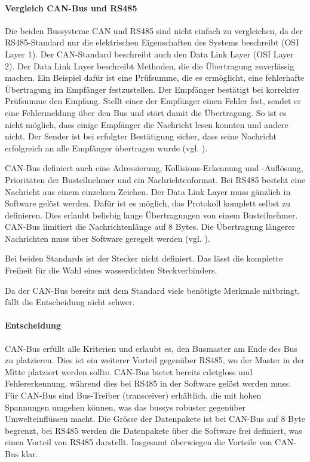 \paragraph{Vergleich CAN-Bus und RS485} Die beiden Bussysteme CAN und RS485 sind nicht einfach zu vergleichen, da der RS485-Standard nur die elektrischen Eigenschaften des Systems beschreibt (OSI Layer 1). Der CAN-Standard beschreibt auch den Data Link Layer (OSI Layer 2). Der Data Link Layer beschreibt Methoden, die die Übertragung zuverlässig machen. Ein Beispiel dafür ist eine Prüfsumme, die es ermöglicht, eine fehlerhafte Übertragung im Empfänger festzustellen. Der Empfänger bestätigt bei korrekter Prüfsumme den Empfang. Stellt einer der Empfänger einen Fehler fest, sendet er eine Fehlermeldung über den Bus und stört damit die Übertragung. So ist es nicht möglich, dass einige Empfänger die Nachricht lesen konnten und andere nicht. Der Sender ist bei erfolgter Bestätigung sicher, dass seine Nachricht erfolgreich an alle Empfänger übertragen wurde (vgl. \cite{ixxatcan}). 

CAN-Bus definiert auch eine Adressierung, Kollisions-Erkennung und -Auflösung, Prioritäten der Busteilnehmer und ein Nachrichtenformat. Bei RS485 besteht eine Nachricht aus einem einzelnen Zeichen. Der Data Link Layer muss gänzlich in Software gelöst werden. Dafür ist es möglich, das Protokoll komplett selbst zu definieren. Dies erlaubt beliebig lange Übertragungen von einem Busteilnehmer. CAN-Bus limitiert die Nachrichtenlänge auf 8 Bytes. Die Übertragung längerer Nachrichten muss über Software geregelt werden (vgl. \cite{ixxatcan}).

Bei beiden Standards ist der Stecker nicht definiert. Das lässt die komplette Freiheit für die Wahl eines wasserdichten Steckverbinders.

Da der CAN-Bus bereits mit dem Standard viele benötigte Merkmale mitbringt, fällt die Entscheidung nicht schwer.

\paragraph{Entscheidung}
CAN-Bus erfüllt alle Kriterien und erlaubt es, den Busmaster am Ende des Bus zu platzieren. Dies ist ein weiterer Vorteil gegenüber RS485, wo der Master in der Mitte platziert werden sollte. CAN-Bus bietet bereits \gls{cdetgloss} und Fehlererkennung, während dies bei RS485 in der Software gelöst werden muss. Für CAN-Bus sind Bus-Treiber (\gls{transceiver}) erhältlich, die mit hohen Spannungen umgehen können, was das \gls{bussys} robuster gegenüber Umwelteinflüssen macht. Die Grösse der Datenpakete ist bei CAN-Bus auf 8 Byte begrenzt, bei RS485 werden die Datenpakete über die Software frei definiert, was einen Vorteil von RS485 darstellt. Insgesamt überwiegen die Vorteile von CAN-Bus klar. 

